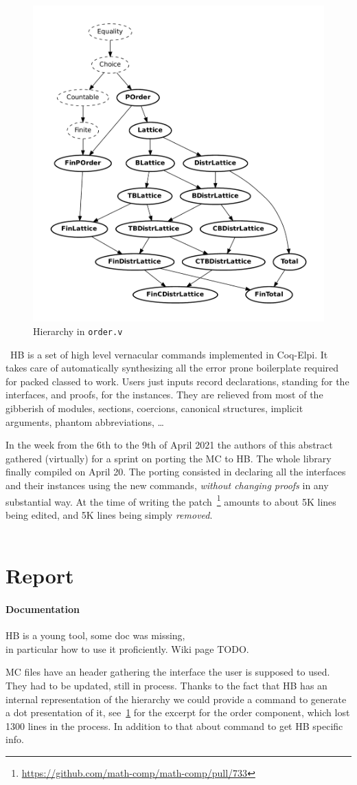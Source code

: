 \documentclass{easychair}
\def\MC{{\sf MC}}
\def\HB{{\sf HB}}
\begin{document}
\begin{figure}
  \vspace{-1em}
	\includegraphics[width=.40\textwidth]{order.pdf}
  \caption{\small Hierarchy in {\tt order.v}}
	\label{fig:order}
  
\end{figure}
\
\HB{} is a set of high level vernacular commands implemented in Coq-Elpi. It takes
care of automatically synthesizing all the error prone boilerplate required for
packed classed to work. Users just inputs record declarations,
standing for the interfaces, and proofs, for the instances.
They are relieved from
most of the gibberish of modules, sections, coercions, canonical
structures, implicit arguments, phantom abbreviations, \ldots

In the week from the 6th to the 9th of April 2021 the authors of this abstract
gathered (virtually) for a sprint on porting the \MC{} to
\HB{}. The whole library finally compiled on April 20.
The porting consisted in declaring all the interfaces and their instances
using the new commands, \emph{without changing proofs} in any substantial way.
At the time of writing the patch~\footnote{\url{https://github.com/math-comp/math-comp/pull/733}}
amounts to about 5K lines being edited, and 5K lines being simply \emph{removed}.\\
\
\vspace{-2em}
\section{Report}
\paragraph{Documentation}
\HB{} is a young tool, some doc was missing, \\
in particular how to use it
proficiently. Wiki page TODO.

\MC{} files have an header gathering the interface the user is supposed to used.
They had to be updated, still in process. Thanks to the fact that \HB{} has an
internal representation of the hierarchy we could provide a command to
generate a dot presentation of it, see~\ref{fig:order} for the excerpt for the
order component, which lost 1300 lines in the process. In addition to that about command to get \HB{}
specific info.
\end{document}

